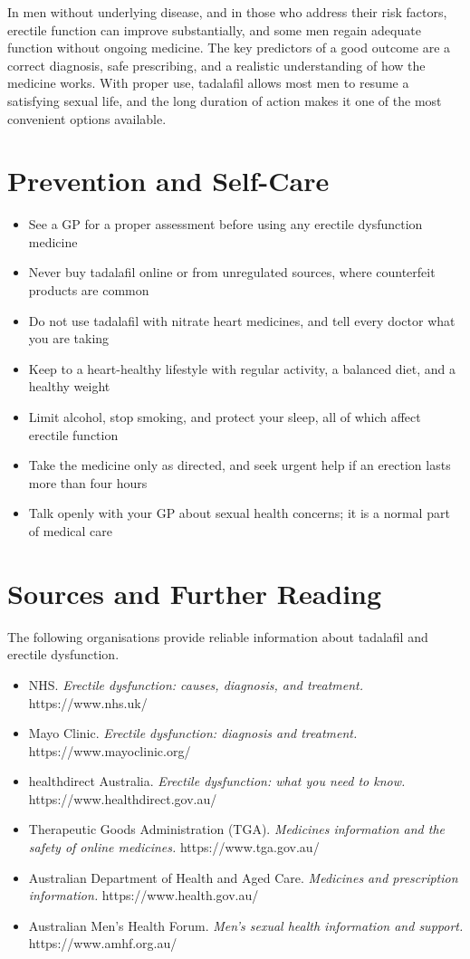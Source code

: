 In men without underlying disease, and in those who address their risk factors, erectile function can improve substantially, and some men regain adequate function without ongoing medicine. The key predictors of a good outcome are a correct diagnosis, safe prescribing, and a realistic understanding of how the medicine works. With proper use, tadalafil allows most men to resume a satisfying sexual life, and the long duration of action makes it one of the most convenient options available.

\section*{Prevention and Self-Care}
\begin{itemize}
    \item See a GP for a proper assessment before using any erectile dysfunction medicine
    \item Never buy tadalafil online or from unregulated sources, where counterfeit products are common
    \item Do not use tadalafil with nitrate heart medicines, and tell every doctor what you are taking
    \item Keep to a heart-healthy lifestyle with regular activity, a balanced diet, and a healthy weight
    \item Limit alcohol, stop smoking, and protect your sleep, all of which affect erectile function
    \item Take the medicine only as directed, and seek urgent help if an erection lasts more than four hours
    \item Talk openly with your GP about sexual health concerns; it is a normal part of medical care
\end{itemize}

\section*{Sources and Further Reading}
The following organisations provide reliable information about tadalafil and erectile dysfunction.

\begin{itemize}
    \item NHS. \textit{Erectile dysfunction: causes, diagnosis, and treatment.} https://www.nhs.uk/
    \item Mayo Clinic. \textit{Erectile dysfunction: diagnosis and treatment.} https://www.mayoclinic.org/
    \item healthdirect Australia. \textit{Erectile dysfunction: what you need to know.} https://www.healthdirect.gov.au/
    \item Therapeutic Goods Administration (TGA). \textit{Medicines information and the safety of online medicines.} https://www.tga.gov.au/
    \item Australian Department of Health and Aged Care. \textit{Medicines and prescription information.} https://www.health.gov.au/
    \item Australian Men's Health Forum. \textit{Men's sexual health information and support.} https://www.amhf.org.au/
\end{itemize}
\clearpage
